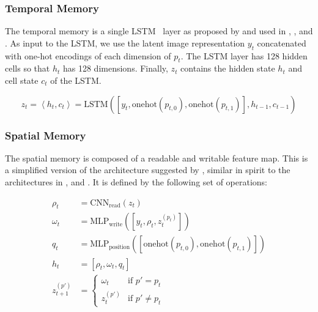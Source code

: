 \subsubsection{Temporal Memory}

The temporal memory is a single LSTM~\cite{hochreiter_long_1997} layer as proposed by \cite{hausknecht_deep_2017} and used in \cite{mnih_asynchronous_2016}, \cite{mirowski_learning_2017}, and \cite{gupta_cognitive_2019}.
As input to the LSTM, we use the latent image representation \(y_t\) concatenated with one-hot encodings of each dimension of \(p_t\).
The LSTM layer has 128 hidden cells so that \(h_t\) has 128 dimensions.
Finally, \(z_t\) contains the hidden state \(h_t\) and cell state \(c_t\) of the LSTM.

\begin{equation}
    z_t = \left\langle h_t, c_t \right\rangle = \text{LSTM}(\left\lbrack y_t, \text{onehot}(p_{t,0}), \text{onehot}(p_{t,1}) \right\rbrack, h_{t-1}, c_{t-1})
\end{equation}

\subsubsection{Spatial Memory}

The spatial memory is composed of a readable and writable feature map.
This is a simplified version of the architecture suggested by \cite{parisotto_neural_2017}, similar in spirit to the architectures in \cite{henriques_mapnet_2018}, \cite{gupta_cognitive_2019} and \cite{chaplot_object_2020}.
It is defined by the following set of operations:

\begin{align}
    \rho_t &= \text{CNN}_\text{read}(z_t) \\
    \omega_t &= \text{MLP}_\text{write}(\left\lbrack y_t, \rho_t, z_t^{(p_t)} \right\rbrack) \\
    q_t &= \text{MLP}_\text{position}(\left\lbrack \text{onehot}(p_{t,0}), \text{onehot}(p_{t,1}) \right\rbrack) \\
    h_t &= \left\lbrack \rho_t, \omega_t, q_t \right\rbrack \\
    z_{t+1}^{(p')} &=
    \begin{cases}
        \omega_t & \text{if } p' = p_t \\
        z_{t}^{(p')} & \text{if } p' \neq p_t
    \end{cases}
\end{align}


